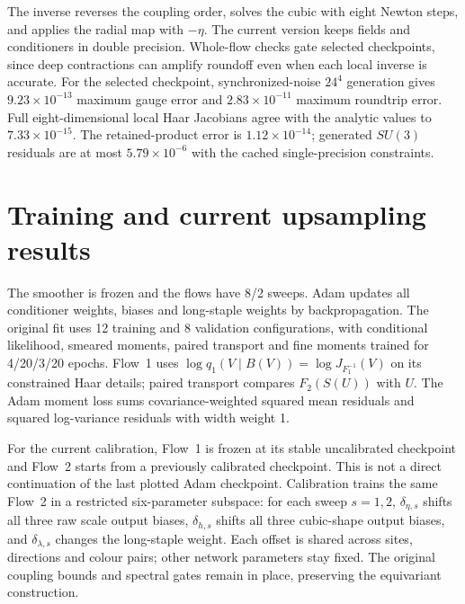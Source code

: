 \documentclass[aps,prd,superscriptaddress,nofootinbib,eqsecnum,floatfix,amsmath,longbibliography]{revtex4-2}
\newcommand{\SU}{SU(3)}
\begin{document}
The inverse reverses the coupling order, solves the cubic with eight Newton
steps, and applies the radial map with $-\eta$. The current version keeps
fields and conditioners in double precision. Whole-flow checks gate selected
checkpoints, since deep contractions can amplify roundoff even
when each local inverse is accurate.
For the selected checkpoint, synchronized-noise $24^4$ generation gives
$9.23\times10^{-13}$ maximum gauge error and $2.83\times10^{-11}$ maximum roundtrip error. Full eight-dimensional local Haar Jacobians
agree with the analytic values to $7.33\times10^{-15}$.
The retained-product error is $1.12\times10^{-14}$; generated $\SU$ residuals are at most $5.79\times10^{-6}$ with the cached single-precision constraints.

\section{Training and current upsampling results}
The smoother is frozen and the flows have 8/2 sweeps. Adam updates all
conditioner weights, biases and long-staple weights by backpropagation.
The original fit uses 12 training and 8 validation configurations, with
conditional likelihood, smeared moments, paired transport and fine moments
trained for 4/20/3/20 epochs. Flow~1 uses
$\log q_1(V\mid B(V))=\log J_{F_1^{-1}}(V)$ on its constrained Haar details;
paired transport compares $F_2(S(U))$ with $U$.
The Adam moment loss sums covariance-weighted squared mean residuals and
squared log-variance residuals with width weight 1.

For the current calibration, Flow~1 is frozen at its stable uncalibrated
checkpoint and Flow~2 starts from a previously calibrated checkpoint.
This is not a direct continuation of the last plotted Adam checkpoint.
Calibration trains the same Flow~2 in a restricted six-parameter subspace:
for each sweep $s=1,2$, $\delta_{\eta,s}$ shifts all three raw scale
output biases, $\delta_{h,s}$ shifts all three cubic-shape output biases,
and $\delta_{\lambda,s}$ changes the long-staple weight.
Each offset is shared across sites, directions and colour pairs; other
network parameters stay fixed. The original coupling bounds and spectral
gates remain in place, preserving the equivariant construction.
\end{document}
